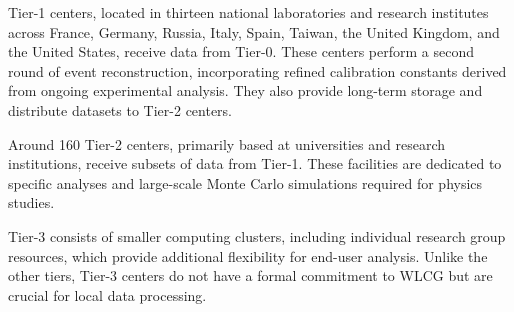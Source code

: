 Tier-1 centers, located in thirteen national laboratories and research institutes across France, Germany, Russia, Italy, Spain, Taiwan, the United Kingdom, and the United States, receive data from Tier-0. These centers perform a second round of event reconstruction, incorporating refined calibration constants derived from ongoing experimental analysis. They also provide long-term storage and distribute datasets to Tier-2 centers.

Around 160 Tier-2 centers, primarily based at universities and research institutions, receive subsets of data from Tier-1. These facilities are dedicated to specific analyses and large-scale Monte Carlo simulations required for physics studies.

Tier-3 consists of smaller computing clusters, including individual research group resources, which provide additional flexibility for end-user analysis. Unlike the other tiers, Tier-3 centers do not have a formal commitment to WLCG but are crucial for local data processing.







